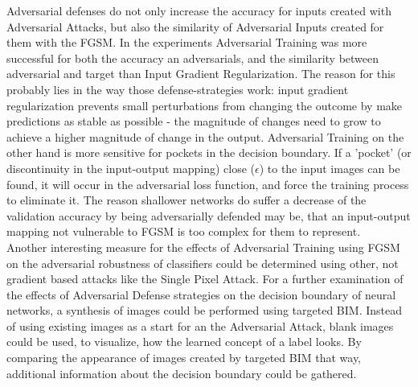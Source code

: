 \documentclass[draft,final]{vutinfth} %
\begin{document}
Adversarial defenses do not only increase the accuracy for inputs created with Adversarial Attacks, but also the similarity of Adversarial Inputs created for them with the FGSM. 
In the experiments Adversarial Training was more successful for both the accuracy an adversarials, and the similarity between adversarial and target than Input Gradient Regularization.
The reason for this probably lies in the way those defense-strategies work: input gradient regularization prevents small perturbations from changing the outcome by make predictions as stable as possible - the magnitude of changes need to grow to achieve a higher magnitude of change in the output.
Adversarial Training on the other hand is more sensitive for pockets in the decision boundary.
If a 'pocket' (or discontinuity in the input-output mapping) close ($\epsilon$) to the input images can be found, it will occur in the adversarial loss function, and force the training process to eliminate it.
The reason shallower networks do suffer a decrease of the validation accuracy by being adversarially defended may be, that an input-output mapping not vulnerable to FGSM is too complex for them to represent.
\\
Another interesting measure for the effects of Adversarial Training using FGSM on the adversarial robustness of classifiers could be determined using other, not gradient based attacks like the Single Pixel Attack.
For a further examination of the effects of Adversarial Defense strategies on the decision boundary of neural networks, a synthesis of images could be performed using targeted BIM.
Instead of using existing images as a start for an the Adversarial Attack, blank images could be used, to visualize, how the learned concept of a label looks.
By comparing the appearance of images created by targeted BIM that way, additional information about the decision boundary could be gathered.

\backmatter

\listoffigures %



\printindex

\printglossaries



\end{document}
